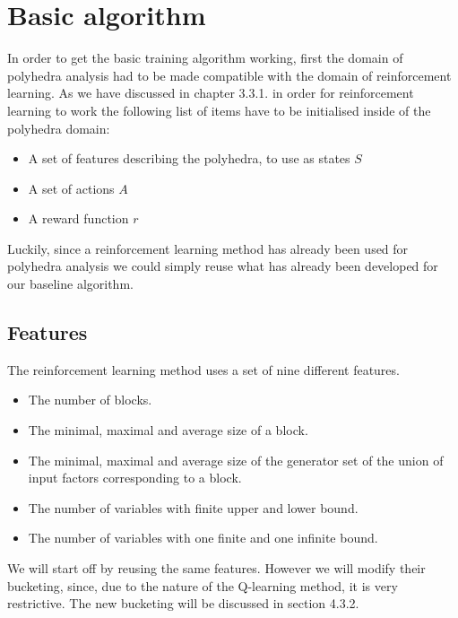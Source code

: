 \section{Basic algorithm}
In order to get the basic training algorithm working, first the domain of polyhedra analysis had to be made compatible with the domain of reinforcement learning. As we have discussed in chapter 3.3.1. in order for reinforcement learning to work the following list of items have to be initialised inside of the polyhedra domain:
\begin{itemize}
	\item A set of features describing the polyhedra, to use as states $S$
	\item A set of actions $A$
	\item A reward function $r$
\end{itemize}
Luckily, since a reinforcement learning method \cite{singh2018fast} has already been used for polyhedra analysis we could simply reuse what has already been developed for our baseline algorithm.\\
\subsection{Features}
The reinforcement learning method uses a set of nine different features.
\begin{itemize}
	\item The number of blocks.
	\item The minimal, maximal and average size of a block.
	\item The minimal, maximal and average size of the generator set of the union of input factors corresponding to a block.
	\item The number of variables with finite upper and lower bound.
	\item The number of variables with one finite and one infinite bound.
\end{itemize}
We will start off by reusing the same features. However we will modify their bucketing, since, due to the nature of the Q-learning method, it is very restrictive. The new bucketing will be discussed in section 4.3.2.

